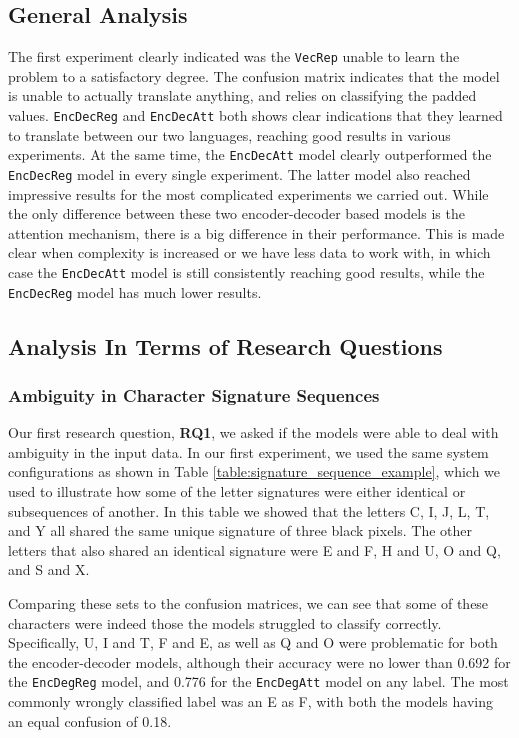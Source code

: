 \subsection{General Analysis}
The first experiment clearly indicated was the {\tt VecRep} unable to learn the problem to a satisfactory degree. The confusion matrix indicates that the model is unable to actually translate anything, and relies on classifying the padded values. {\tt EncDecReg} and {\tt EncDecAtt} both shows clear indications that they learned to translate between our two languages, reaching good results in various experiments. At the same time, the {\tt EncDecAtt} model clearly outperformed the {\tt EncDecReg} model in every single experiment. The latter model also reached impressive results for the most complicated experiments we carried out. While the only difference between these two encoder-decoder based models is the attention mechanism, there is a big difference in their performance. This is made clear when complexity is increased or we have less data to work with, in which case the {\tt EncDecAtt} model is still consistently reaching good results, while the {\tt EncDecReg} model has much lower results.

\subsection{Analysis In Terms of Research Questions}

\subsubsection{Ambiguity in Character Signature Sequences}
Our first research question, \textbf{RQ1}, we asked if the models were able to deal with ambiguity in the input data. In our first experiment, we used the same system configurations as shown in Table \ref{table:signature_sequence_example}, which we used to illustrate how some of the letter signatures were either identical or subsequences of another. In this table we showed that the letters C, I, J, L, T, and Y all shared the same unique signature of three black pixels. The other letters that also shared an identical signature were E and F, H and U, O and Q, and S and X. 

Comparing these sets to the confusion matrices, we can see that some of these characters were indeed those the models struggled to classify correctly. Specifically, U, I and T, F and E, as well as Q and O were problematic for both the encoder-decoder models, although their accuracy were no lower than 0.692 for the {\tt EncDegReg} model, and 0.776 for the {\tt EncDegAtt} model on any label. The most commonly wrongly classified label was an E as F, with both the models having an equal confusion of 0.18. 


